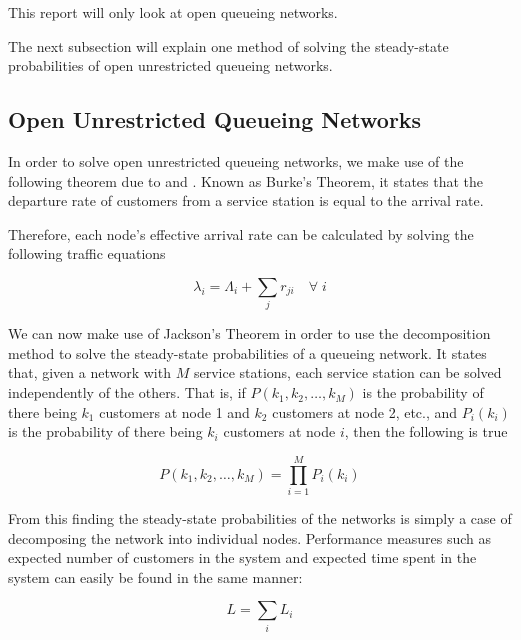 \documentclass{article}
\begin{document}
This report will only look at open queueing networks.

The next subsection will explain one method of solving the steady-state probabilities of open unrestricted queueing networks.

\subsection{Open Unrestricted Queueing Networks}

In order to solve open unrestricted queueing networks, we make use of the following theorem due to \cite{burke56} and \cite{reich57}.
Known as Burke's Theorem, it states that the departure rate of customers from a service station is equal to the arrival rate.

Therefore, each node's effective arrival rate can be calculated by solving the following traffic equations

\begin{equation}
    \lambda_i = \Lambda_i + \sum_j r_{ji} \quad \forall\; i
\end{equation}

We can now make use of Jackson's Theorem \cite{jackson57} in order to use the decomposition method to solve the steady-state probabilities of a queueing network.
It states that, given a network with $M$ service stations, each service station can be solved independently of the others.
That is, if $P(k_1, k_2, \dotsc, k_M)$ is the probability of there being $k_1$ customers at node 1 and $k_2$ customers at node 2, etc., and $P_i(k_i)$ is the probability of there being $k_i$ customers at node $i$, then the following is true

\begin{equation}
    P(k_1, k_2, \dotsc, k_M) = \prod_{i=1}^M P_i(k_i)
\end{equation}

From this finding the steady-state probabilities of the networks is simply a case of decomposing the network into individual nodes.
Performance measures such as expected number of customers in the system and expected time spent in the system can easily be found in the same manner:

\begin{equation}
    L = \sum_i L_i
\end{equation}
\end{document}
